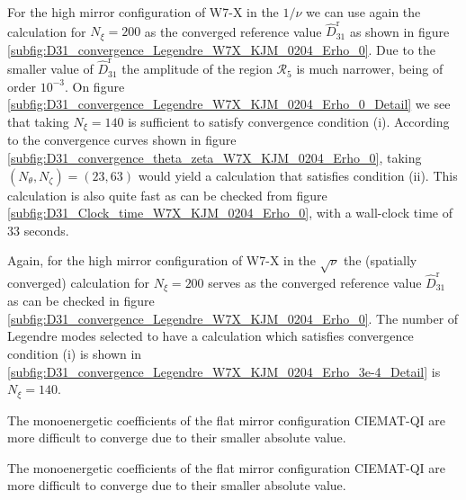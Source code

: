 \FloatBarrier
For the high mirror configuration of W7-X in the $1/\nu$ we can use again the calculation for $N_\xi=200$ as the converged reference value $\widehat{D}_{31}^{\text{r}}$ as shown in figure \ref{subfig:D31_convergence_Legendre_W7X_KJM_0204_Erho_0}. Due to the smaller value of $\widehat{D}_{31}^{\text{r}}$ the amplitude of the region $\mathcal{R}_{5}$ is much narrower, being of order $10^{-3}$. On figure \ref{subfig:D31_convergence_Legendre_W7X_KJM_0204_Erho_0_Detail} we see that taking $N_\xi=140$ is sufficient to satisfy convergence condition (i). According to the convergence curves shown in figure \ref{subfig:D31_convergence_theta_zeta_W7X_KJM_0204_Erho_0}, taking $(N_\theta,N_\zeta)=(23,63)$ would yield a calculation that satisfies condition (ii). This calculation is also quite fast as can be checked from figure \ref{subfig:D31_Clock_time_W7X_KJM_0204_Erho_0}, with a wall-clock time of 33 seconds. 


\FloatBarrier
Again, for the high mirror configuration of W7-X in the $\sqrt{\nu}$ the (spatially converged) calculation for $N_\xi=200$ serves as the converged reference value $\widehat{D}_{31}^{\text{r}}$ as can be checked in figure \ref{subfig:D31_convergence_Legendre_W7X_KJM_0204_Erho_0}. The number of Legendre modes selected to have a calculation which satisfies convergence condition (i) is shown in \ref{subfig:D31_convergence_Legendre_W7X_KJM_0204_Erho_3e-4_Detail} is $N_\xi=140$.




%
%
\FloatBarrier
The monoenergetic coefficients of the flat mirror configuration CIEMAT-QI are more difficult to converge due to their smaller absolute value. 



The monoenergetic coefficients of the flat mirror configuration CIEMAT-QI are more difficult to converge due to their smaller absolute value. 


